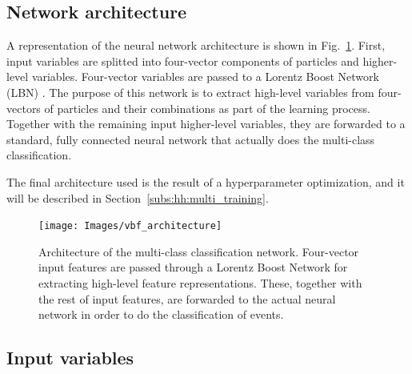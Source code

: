 \documentclass[../main.tex]{subfiles}
\begin{document}
\subsection{Network architecture}

A representation of the neural network architecture is shown in Fig.~\ref{fig:hh:multi_architecture}. First, input variables are splitted into four-vector components of particles and higher-level variables. Four-vector variables are passed to a Lorentz Boost Network (LBN) \cite{hh:analysis:lbn}.
The purpose of this network is to extract high-level variables from four-vectors of particles and their combinations as part of the learning process. Together with the remaining input higher-level variables, they are forwarded to a standard, fully connected neural network that actually does the multi-class classification.

The final architecture used is the result of a hyperparameter optimization, and it will be described in Section~\ref{subs:hh:multi_training}.


\begin{figure}[h!]
\texttt{[image: Images/vbf\_architecture]}
\caption[Multi-class DNN architecture]{Architecture of the multi-class classification network. Four-vector input features are passed through a Lorentz Boost Network for extracting high-level feature representations. These, together with the rest of input features, are forwarded to the actual neural network in order to do the classification of events.}
\label{fig:hh:multi_architecture}
\end{figure}

\subsection{Input variables}
\end{document}
